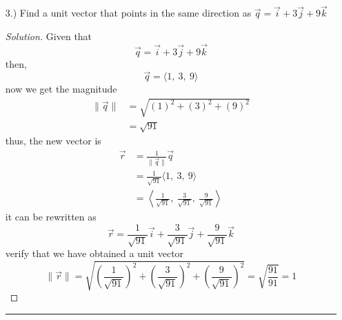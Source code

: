 \documentclass[12pt]{article}
\begin{document}
\begin{enumerate}
\begin{enumerate}
				\item[c.)] \(\displaystyle \left\|10\vec{a}+3\vec{b}\right\|\)
					\begin{proof}[Solution]
						First we solve each term using scalar multiplication
						\begin{align*}
							10\vec{a} & = \langle 10\left(8\right),~10\left(5\right)\rangle \\
							& = \langle 80,~50\rangle \\
							3\vec{b} & = \langle 3\left(-3\right),~3\left(6\right)\rangle \\
							& = \langle -9,~18\rangle
						\end{align*}
						then,
						\begin{align*}
							10\vec{a}+3\vec{b} & = \langle 80+\left(-9\right),~50+18\rangle \\
							& = \langle 71,~68\rangle
						\end{align*}
						then, we solve for the magnitude which is expressed as
						\[\|\vec{v}\| =\sqrt{a_1^2+a_2^2+a_3^2}\]
						thus,
						\begin{align*}
							\left\|10\vec{a}+3\vec{b}\right\| & = \sqrt{\left(71\right)^2+\left(68\right)^2} \\
							& = \sqrt{9665}
						\end{align*}
					\end{proof}
			\end{enumerate}
			\hrule
		
		\item[3.)] Find a unit vector that points in the same direction as \(\vec{q} = \vec{i}+3\vec{j}+9\vec{k}\)
			\begin{proof}[Solution]
				Given that
				\[\vec{q} = \vec{i}+3\vec{j}+9\vec{k}\]
				then,
				\[\vec{q} = \langle 1,~3,~9\rangle\]
				now we get the magnitude
				\begin{align*}
					\|\vec{q}\| & = \sqrt{\left(1\right)^2+\left(3\right)^2+\left(9\right)^2} \\
					& = \sqrt{91}
				\end{align*}
				thus, the new vector is
				\begin{align*}
					\vec{r} & = \frac{1}{\|\vec{q}\|}\vec{q} \\
					& = \frac{1}{\sqrt{91}} \langle 1,~3,~9\rangle \\
					& = \left\langle \frac{1}{\sqrt{91}},~\frac{3}{\sqrt{91}},~\frac{9}{\sqrt{91}}\right\rangle
				\end{align*}
				it can be rewritten as
				\[\vec{r} = \frac{1}{\sqrt{91}}\vec{i}+\frac{3}{\sqrt{91}}\vec{j}+\frac{9}{\sqrt{91}}\vec{k}\]
				verify that we have obtained a unit vector
				\[\|\vec{r}\| = \sqrt{\left(\frac{1}{\sqrt{91}}\right)^2+\left(\frac{3}{\sqrt{91}}\right)^2+\left(\frac{9}{\sqrt{91}}\right)^2} = \sqrt{\frac{91}{91}} = 1\]
			\end{proof}
			\hrule
		

\end{enumerate}
\end{document}
